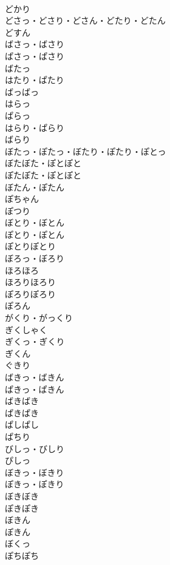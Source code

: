 \documentclass[8pt]{extreport}
\begin{document}
\begin{CJK}{UTF8}{min}
\\	どかり	
\\	どさっ・どさり・どさん・どたり・どたん	
\\	どすん	
\\	ばさっ・ばさり	
\\	ぱさっ・ぱさり	
\\	ばたっ	
\\	はたり・ぱたり	
\\	ばっばっ	
\\	はらっ	
\\	ぱらっ	
\\	はらり・ぱらり	
\\	ばらり	
\\	ぼたっ・ぽたっ・ぼたり・ぽたり・ぽとっ	
\\	ぼたぼた・ぽとぽと	
\\	ぽたぽた・ぽとぽと	
\\	ぼたん・ぽたん	
\\	ぽちゃん	
\\	ぽつり	
\\	ぼとり・ぼとん	
\\	ぽとり・ぽとん	
\\	ぽとりぽとり	
\\	ぼろっ・ぼろり	
\\	ほろほろ	
\\	ほろりほろり	
\\	ぽろりぽろり	
\\	ぽろん	
\\	がくり・がっくり	
\\	ぎくしゃく	
\\	ぎくっ・ぎくり	
\\	ぎくん	
\\	ぐきり	
\\	ばきっ・ばきん	
\\	ぱきっ・ぱきん	
\\	ばきばき	
\\	ぱきぱき	
\\	ぱしぱし	
\\	ぱちり	
\\	びしっ・びしり	
\\	ぴしっ	
\\	ぼきっ・ぼきり	
\\	ぽきっ・ぽきり	
\\	ぼきぼき	
\\	ぽきぽき	
\\	ぼきん	
\\	ぽきん	
\\	ぼくっ	
\\	ぽちぽち	

\end{CJK}
\end{document}
